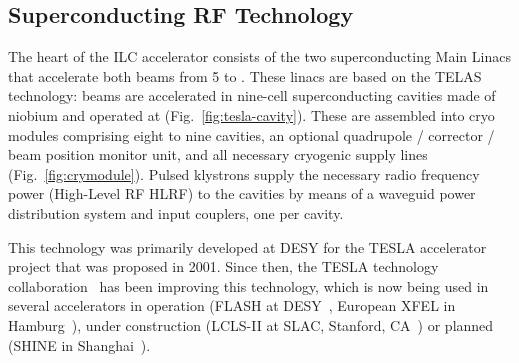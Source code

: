 \subsection{Superconducting RF Technology}


%
%
%
%


The heart of the ILC accelerator consists of the two superconducting Main Linacs that accelerate both beams from \num{5} to .
These linacs are based on the TELAS technology:
beams are accelerated in  nine-cell superconducting cavities made of niobium and operated at  (Fig.~\ref{fig:tesla-cavity}). These 
 are assembled into cryo modules comprising eight to nine cavities, an optional quadrupole / corrector / beam position monitor unit, and all necessary cryogenic supply lines (Fig.~\ref{fig:crymodule}). 
Pulsed klystrons supply the necessary radio frequency power (High-Level RF HLRF) to the cavities by means of a waveguid power distribution system and input couplers, one per cavity.

This technology was primarily developed at DESY for the TESLA accelerator project that was proposed in 2001.
Since then, the TESLA technology collaboration~\cite{bib:ttc} has been improving this technology, which is now being used in several accelerators in operation (FLASH at DESY~\cite{schreiber_faatz_2015,Vogt:2018wvy}, European XFEL in Hamburg~\cite{bib:xfel}), under construction (LCLS-II at SLAC, Stanford, CA~\cite{bib:lcls-ii}) or planned (SHINE in Shanghai~\cite{Zhao:2018lcl}).


%

